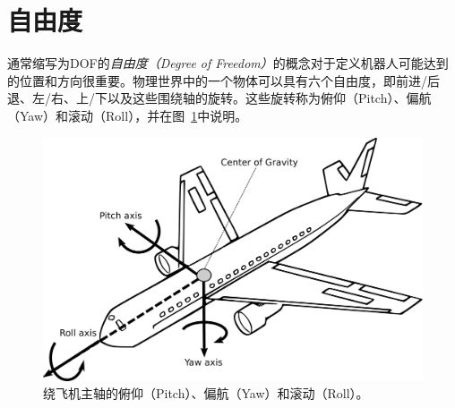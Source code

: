 \section{自由度}\label{sec:dof}


通常缩写为DOF的\emph{自由度（Degree of Freedom）}的概念对于定义机器人可能达到的位置和方向很重要。物理世界中的一个物体可以具有六个自由度，即前进/后退、左/右、上/下以及这些围绕轴的旋转。这些旋转称为俯仰（Pitch）、偏航（Yaw）和滚动（Roll），并在图~\ref{fig:pitchyawandroll}中说明。

\begin{figure}
	\centering
		\includegraphics[width=\textwidth]{figs/pitchyawroll.png}
	\caption{绕飞机主轴的俯仰（Pitch）、偏航（Yaw）和滚动（Roll）。}
	\label{fig:pitchyawandroll}
\end{figure}


